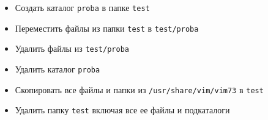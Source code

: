 \documentclass[a4paper,12pt]{article}
\begin{document}
\begin{flushleft}
\begin{enumerate}
\begin{itemize}
        \item Создать каталог \texttt{proba} в папке \texttt{test}
        \item Переместить файлы из папки \texttt{test} в \texttt{test/proba}
        \item Удалить файлы из \texttt{test/proba}
        \item Удалить каталог \texttt{proba}
        \item Скопировать все файлы и папки из \texttt{/usr/share/vim/vim73} в \texttt{test}
        \item Удалить папку \texttt{test} включая все ее файлы и подкаталоги
      \end{itemize}
    \end{enumerate}
  \end{flushleft}
\end{document}
